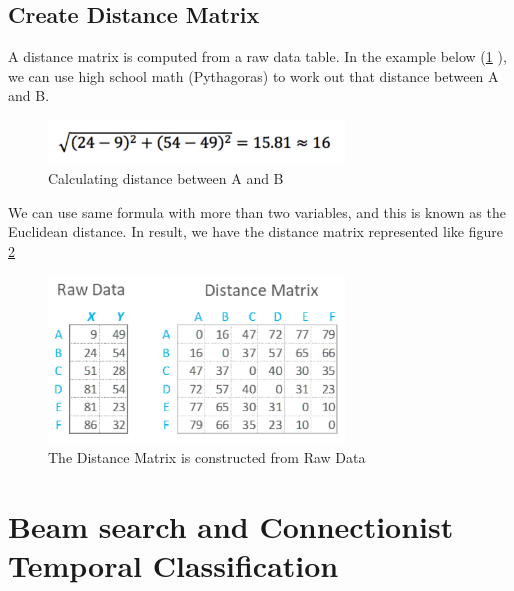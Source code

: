 
\subsection{ Create Distance Matrix }
A distance matrix is computed from a raw data table. In the example below (\ref{fig:Chap3-DM_Formula} ), we can use high school math (Pythagoras) to work out 
that distance between A and B. 

\begin{figure}[H]
	\centering
	\includegraphics[width=0.7\textwidth]{img/Chap3/DM_Formula}
	\caption{ Calculating distance between A and B}
	\label{fig:Chap3-DM_Formula}
\end{figure}
      
We can use same formula with more than two variables, and this is known as 
the Euclidean distance.
In result, we have the distance matrix represented like figure \ref{fig:Chap3-DM-Raw}
\begin{figure}[H]
	\centering
	\includegraphics[width=0.7\textwidth]{img/Chap3/DM-Raw}
	\caption{ The Distance Matrix is constructed from Raw Data }
	\label{fig:Chap3-DM-Raw}
\end{figure}
      
\section{ Beam search and Connectionist Temporal Classification }
